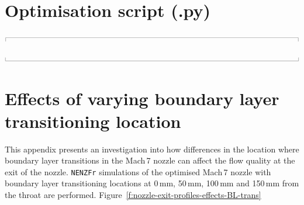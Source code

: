 \documentclass[12pt,a4paper]{article}
\newcommand{\topbar}{\ensuremath{
    \rule{0.1mm}{2.0mm} \rule[2.0mm]{159.5mm}{0.1mm} \rule{0.1mm}{2.0mm}
}}
\newcommand{\bottombar}{\ensuremath{
    \rule{0.1mm}{2.0mm} \rule{159.5mm}{0.1mm} \rule{0.1mm}{2.0mm}
}}
\begin{document}
\section{Optimisation script (.py)}
\label{app:optimisation-script}
\topbar

\bottombar

\newpage
\section{Effects of varying boundary layer transitioning location}
\label{app:effects-BL-trans-location}
%
This appendix presents an investigation into how differences in the location where 
boundary layer transitions in the Mach\,7 nozzle can affect the flow quality at 
the exit of the nozzle. \texttt{NENZFr} simulations of the optimised Mach\,7 nozzle 
with boundary layer transitioning locations at 0\,mm, 50\,mm, 100\,mm and 150\,mm 
from the throat are performed. Figure~\ref{f:nozzle-exit-profiles-effects-BL-trans}
%
\end{document}
